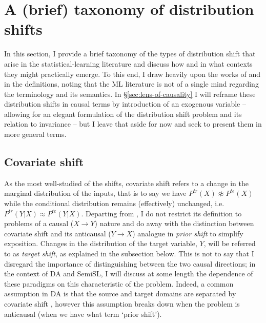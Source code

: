 \section{A (brief) taxonomy of distribution shifts}\label{sec:dist-shift}
In this section, I provide a brief taxonomy of the types of distribution shift that arise in the
statistical-learning literature and discuss how and in what contexts they might practically emerge.
%
To this end, I draw heavily upon the works of \citet{moreno2012unifying} and
\citet{castro2020causality} in the definitions, noting that the \ac{ML} literature is not of a
single mind regarding the terminology and its semantics.
%
In \S\ref{sec:lens-of-causality} I will reframe these distribution shifts in causal terms by
introduction of an exogenous variable -- allowing for an elegant formulation of the distribution
shift problem and its relation to invariance -- but I leave that aside for now and seek to present
them in more general terms.
\subsection{Covariate shift}\label{ssec:covariate-shift}
As the most well-studied of the shifts, covariate shift refers to a change in the marginal
distribution of the inputs, that is to say we have \( P^{tr}(X) \not\approx P^{te}(X) \) while the
conditional distribution remains (effectively) unchanged, i.e. \( P^{tr}(Y|X) \approx P^{te}(Y|X)
\).
%
Departing from \citet{moreno2012unifying}, I do not restrict its definition to problems of a causal
(\( X \to Y\)) nature and do away with the distinction between covariate shift and its anticausal
(\( Y \to X \)) analogue in \emph{prior shift} to simplify exposition.
%
Changes in the distribution of the target variable, \(Y\), will be referred to as \emph{target
shift}, as explained in the subsection below.
%
This is not to say that I disregard the importance of distinguishing between the two causal
directions; in the context of \ac{DA} and \ac{SemiSL}, I will discuss at some length the dependence of these
paradigms on this characteristic of the problem.
%
Indeed, a common assumption in \ac{DA} is that the source and target domains are separated by
covariate shift \citep{david2010impossibility}, however this assumption breaks down when the
problem is anticausal (when we have what \citet{moreno2012unifying} term `prior shift').

